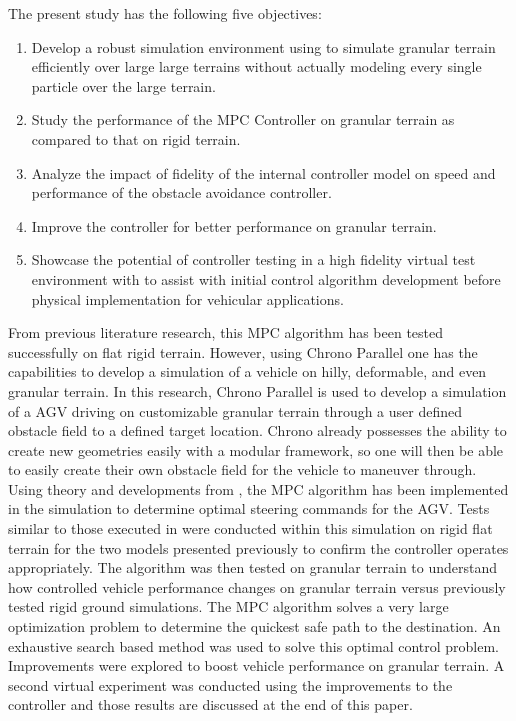 \documentclass[12pt,onecolumn]{report}
\newcommand{\CHRONO}{{\sffamily{{Chrono}}}}
\begin{document}
The present study has the following five objectives:
\begin{enumerate}
\item
Develop a robust simulation environment using {\CHRONO} to simulate granular terrain efficiently over large large terrains without actually modeling every single particle over the large terrain.
\item
Study the performance of the MPC Controller on granular terrain as compared to that on rigid terrain.
\item
Analyze the impact of fidelity of the internal controller model on speed and performance of the obstacle avoidance controller.
\item
Improve the controller for better performance on granular terrain.
\item
Showcase the potential of controller testing in a high fidelity virtual test environment with {\CHRONO} to assist with initial control algorithm development before physical implementation for vehicular applications.
\end{enumerate}

From previous literature research, this MPC algorithm has been tested successfully on flat rigid terrain. However, using Chrono Parallel one has the capabilities to develop a simulation of a vehicle on hilly, deformable, and even granular terrain. In this research, Chrono Parallel is used to develop a simulation of a AGV driving on customizable granular terrain through a user defined obstacle field to a defined target location. Chrono already possesses the ability to create new geometries easily with a modular framework, so one will then be able to easily create their own obstacle field for the vehicle to maneuver through. Using theory and developments from \cite{ModelFidelity2016}, the MPC algorithm has been implemented in the simulation to determine optimal steering commands for the AGV. Tests similar to those executed in \cite{ModelFidelity2016} were conducted within this simulation on rigid flat terrain for the two models presented previously to confirm the controller operates appropriately. The algorithm was then tested on granular terrain to understand how controlled vehicle performance changes on granular terrain versus previously tested rigid ground simulations. The MPC algorithm solves a very large optimization problem to determine the quickest safe path to the destination. An exhaustive search based method was used to solve this optimal control problem. Improvements were explored to boost vehicle performance on granular terrain. A second virtual experiment was conducted using the improvements to the controller and those results are discussed at the end of this paper.
\end{document}

